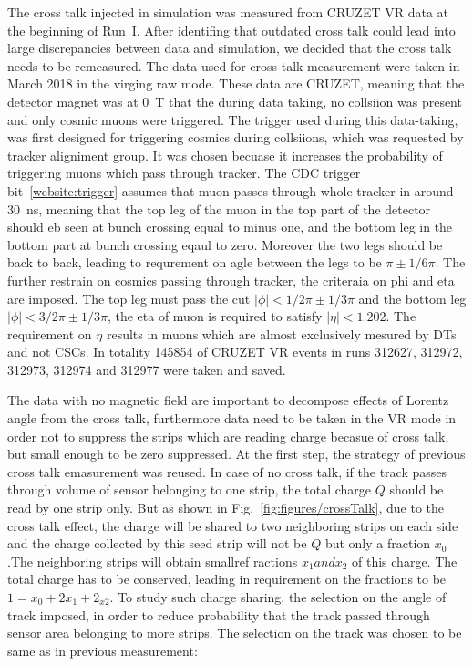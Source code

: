 The cross talk injected in simulation was measured from CRUZET VR data at the beginning of Run~I. After identifing that outdated cross talk could lead into large discrepancies between data and simulation, we decided that the cross talk needs to be remeasured. The data used for cross talk measurement were taken in March 2018 in the virging raw mode. These data are CRUZET, meaning that the detector magnet was at 0~T that the during data taking, no collsiion was present and only cosmic muons were triggered. The trigger used during this data-taking, was first designed for triggering cosmics during collsiions, which was requested by tracker aligniment group. It was chosen becuase it increases the probability of triggering muons which pass through tracker. The CDC trigger bit~\ref{website:trigger} assumes that muon passes through whole tracker in around 30~ns, meaning that the top leg of the muon in the top part of the detector should eb seen at bunch crossing equal to minus one, and the bottom leg in the bottom part at bunch crossing eqaul to zero. Moreover the two legs should be back to back, leading to requrement on agle between the legs to be $\pi \pm 1/6\pi$. The further restrain on cosmics passing through tracker, the criteraia on phi and eta are imposed. The top leg must pass the cut $|\phi|<1/2\pi \pm 1/3\pi$ and the bottom leg $|\phi|<3/2\pi \pm 1/3\pi$, the eta of muon is required to satisfy $|\eta|<1.202$. The requirement on $\eta$ results in muons which are almost exclusively mesured by DTs and not CSCs. In totality 145854 of CRUZET VR events in runs 312627, 312972, 312973, 312974 and 312977 were taken and saved.

The data with no magnetic field are important to decompose effects of Lorentz angle from the cross talk, furthermore data need to be taken in the VR mode in order not to suppress the strips which are reading charge becasue of cross talk, but small enough to be zero suppressed. At the first step, the strategy of previous cross talk emasurement was reused. In case of no cross talk, if the track passes through volume of sensor belonging to one strip, the total charge $Q$ should be read by one strip only. But as shown in Fig.~\ref{fig:figures/crossTalk}, due to the cross talk effect, the charge will be shared to two neighboring strips on each side and the charge collected by this seed strip will not be $Q$ but only a fraction $x_{0}$.The neighboring strips will obtain smallref ractions $x_{1} and x_{2}$ of this charge. The total charge has to be conserved, leading in requirement on the fractions to be $1=x_{0}+2x_{1}+2_{x2}$. To study such charge sharing, the selection on the angle of track imposed, in order to reduce probability that the track passed through sensor area belonging to more strips. The selection on the track was chosen to be same as in previous measurement:

